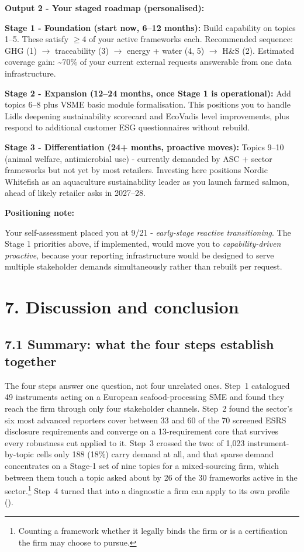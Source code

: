 \documentclass[
]{article}
\begin{document}
\textbf{Output 2 - Your staged roadmap (personalised):}

\textbf{Stage 1 - Foundation (start now, 6--12 months):} Build
capability on topics 1--5. These satisfy $\geq$4 of your active frameworks
each. Recommended sequence: GHG (1) $\to$ traceability (3) $\to$ energy + water
(4, 5) $\to$ H\&S (2). Estimated coverage gain: \textasciitilde70\% of your
current external requests answerable from one data infrastructure.

\textbf{Stage 2 - Expansion (12--24 months, once Stage 1 is
operational):} Add topics 6--8 plus VSME basic module formalisation.
This positions you to handle Lidl\textquotesingle s deepening
sustainability scorecard and EcoVadis level improvements, plus respond
to additional customer ESG questionnaires without rebuild.

\textbf{Stage 3 - Differentiation (24+ months, proactive moves):}
Topics 9--10 (animal welfare, antimicrobial use) - currently demanded
by ASC + sector frameworks but not yet by most retailers. Investing here
positions Nordic Whitefish as an aquaculture sustainability leader as
you launch farmed salmon, ahead of likely retailer asks in 2027--28.

\textbf{Positioning note:}

Your self-assessment placed you at 9/21 - \emph{early-stage reactive
transitioning}. The Stage 1 priorities above, if implemented, would move
you to \emph{capability-driven proactive}, because your reporting
infrastructure would be designed to serve multiple stakeholder demands
simultaneously rather than rebuilt per request.
\clearpage
\fi %

\section{7. Discussion and conclusion}\label{discussion}

\subsection{7.1 Summary: what the four steps establish
together}\label{discussion-summary}

The four steps answer one question, not four unrelated ones. Step~1 catalogued 49
instruments acting on a European seafood-processing SME and found they reach the
firm through only four stakeholder channels. Step~2 found the sector's six most
advanced reporters cover between 33 and 60 of the 70 screened ESRS disclosure
requirements and converge on a 13-requirement core that survives every robustness
cut applied to it. Step~3 crossed the two: of 1{,}023 instrument-by-topic cells only
188 (18\%) carry demand at all, and that sparse demand concentrates on a Stage-1
set of nine topics for a mixed-sourcing firm, which between them touch a topic
asked about by 26 of the 30 frameworks active in the sector.\footnote{Counting a
framework whether it legally binds the firm or is a certification the firm may
choose to pursue.} Step~4 turned that into a diagnostic a firm can apply to its own
profile ().
\end{document}

